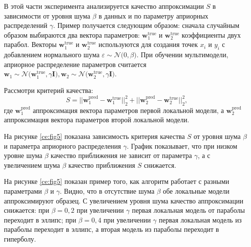 В этой части эксперимента анализируется качество аппроксимации $S$ в зависимости от уровня шума $\beta$ в данных и по параметру априорных распределений $\gamma$. Пример получается следующим образом: сначала случайным образом выбираются два вектора параметров: $\mathbf{w}^\text{true}_{1}$ и $\mathbf{w}^\text{true}_{2}$ коэффициенты двух парабол. Векторы $\mathbf{w}^\text{true}_{1}$ и $\mathbf{w}^\text{true}_{2}$ используются для создания точек $x_i$ и $y_i$ с добавлением нормального шума $\varepsilon\sim\mathcal{N}\bigr(0, \beta\bigr) $. При обучении мультимодели, априорное распределение параметров считается $\mathbf{w}_1\sim\mathcal{N}\bigr(\mathbf{w}^\text{true}_{1}, \gamma\mathbf{I}\bigr), \mathbf{w}_2\sim\mathcal{N}\bigr(\mathbf{w}^\text{true}_{2},\gamma\mathbf{I}\bigr)$.

Рассмотри критерий качества:
\[
S = ||\mathbf{w}^\text{pred}_{1} - \mathbf{w}^\text{true}_{1}||^{2}_{2} + ||\mathbf{w}^\text{pred}_{2} - \mathbf{w}^\text{true}_{2}||^{2}_{2},
\]
где $\mathbf{w}^\text{pred}_{1}$ аппроксимация вектора параметров первой локальной модели, а $\mathbf{w}^\text{pred}_{2} $ аппроксимация вектора параметров второй локальной модели.

На рисунке \ref{ce:fig5} показана зависимость критерия качества $S$ от уровня шума $\beta$ и параметра априорного распределения $\gamma$. График показывает, что при низком уровне шума $\beta$ качество приближения не зависит от параметра $\gamma$, а с увеличением шума $\beta$ качество приближения $S$ снижается.

На рисунке \ref{ce:fig5} показан пример того, как алгоритм работает с разными параметрами $\beta$ и $\gamma$. Видно, что в отсутствие шума $\beta$ обе локальные модели аппроксимируют образец. С увеличением уровня шума качество аппроксимации снижается: при $\beta = 0{,}2$ при увеличении $\gamma$ первая локальная модель от параболы переходит в эллипс; при $\beta = 0{,}4$ при увеличении $\gamma$ первая локальная модель из параболы переходит в эллипс, а вторая модель из параболы переходит в гиперболу.

